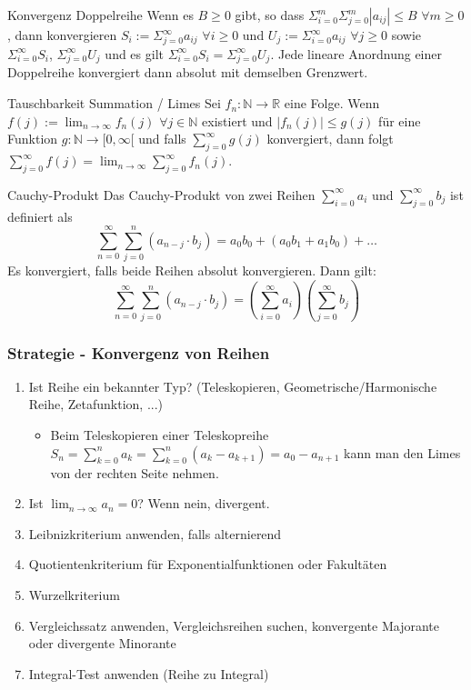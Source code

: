 \documentclass[a4paper,10pt]{article}
\def\limn{\lim_{n\to \infty}}
\begin{document}
\begin{subbox}{Konvergenz Doppelreihe}
  Wenn es $B \geq 0$ gibt, so dass $\Sigma_{i=0}^m \Sigma_{j=0}^m |a_{ij}| \leq B$ $\forall m \geq 0$, dann konvergieren $S_i := \Sigma_{j=0}^\infty a_{ij}$ $\forall i \geq 0$ und $U_j := \Sigma_{i=0}^\infty a_{ij}$ $\forall j \geq 0$ sowie $\Sigma_{i=0}^\infty S_i$, $\Sigma_{j=0}^\infty U_j$ und es gilt $\Sigma_{i=0}^\infty S_i = \Sigma_{j=0}^\infty U_j$. Jede lineare Anordnung einer Doppelreihe konvergiert dann absolut mit demselben Grenzwert.
\end{subbox}

\begin{subbox}{Tauschbarkeit Summation / Limes}
  Sei $f_n : \mathbb{N} \rightarrow \mathbb{R}$ eine Folge. Wenn $f(j) := \limn f_n(j)$ $\forall j \in \mathbb{N}$ existiert und $|f_n(j)| \leq g(j)$ für eine Funktion $g: \mathbb{N} \rightarrow \mathbb [0, \infty[$ und falls $\sum_{j=0}^\infty g(j)$ konvergiert, dann folgt $\sum_{j=0}^\infty f(j) = \limn \sum_{j=0}^\infty f_n(j)$.
\end{subbox}

\begin{mainbox}{Cauchy-Produkt}
  Das Cauchy-Produkt von zwei Reihen $\sum_{i = 0}^\infty a_i$ und $\sum_{j = 0}^\infty b_j$ ist definiert als
  $$\sum_{n=0}^\infty \sum_{j=0}^n (a_{n-j} \cdot b_j) = a_0b_0 + (a_0b_1 + a_1b_0) + \ldots$$ Es konvergiert, falls beide Reihen absolut konvergieren. Dann gilt:\\
  $$\sum_{n=0}^\infty \sum_{j=0}^n (a_{n-j} \cdot b_j) = \left( \sum_{i=0}^\infty a_i \right) \left( \sum_{j=0}^\infty b_j \right)$$
\end{mainbox}


\subsubsection{Strategie - Konvergenz von Reihen}
\begin{enumerate}
 \item Ist Reihe ein bekannter Typ? (Teleskopieren, Geometrische/Harmonische Reihe, Zetafunktion, ...){
  \begin{itemize}
    \item Beim Teleskopieren einer Teleskopreihe $S_n = \sum_{k=0}^n a_k = \sum_{k=0}^n (a_k - a_{k+1}) = a_0 - a_{n+1}$ kann man den Limes von der rechten Seite nehmen.
  \end{itemize}
 }
 \item Ist $\limn a_n = 0$? Wenn nein, divergent.
 \item Leibnizkriterium anwenden, falls alternierend
 \item Quotientenkriterium für Exponentialfunktionen oder Fakultäten
 \item Wurzelkriterium
 \item Vergleichssatz anwenden, Vergleichsreihen suchen, konvergente Majorante oder divergente Minorante
 \item Integral-Test anwenden (Reihe zu Integral)
\end{enumerate}
\end{document}
